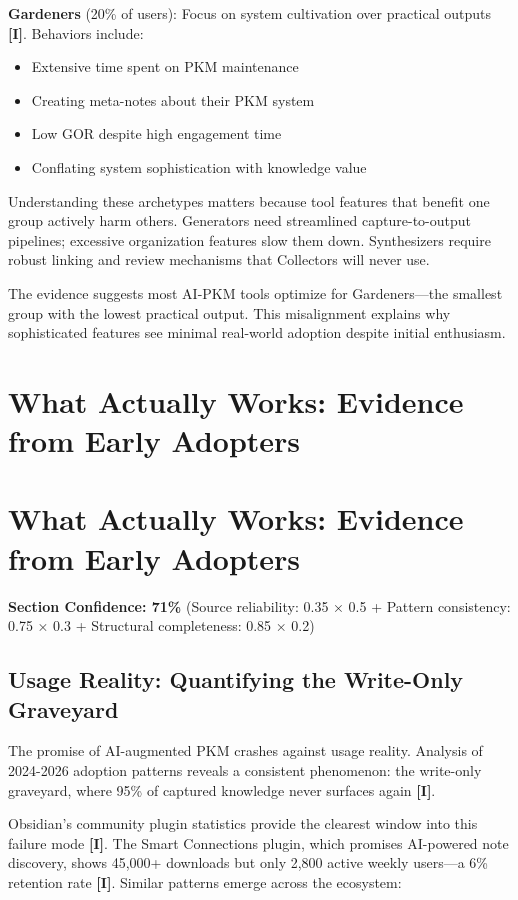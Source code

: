 \documentclass[a4paper,11pt]{article}
\newcommand{\ilabel}{\textbf{\textcolor{icolor}{[I]}}}
\begin{document}
\textbf{Gardeners} (20\% of users): Focus on system cultivation over practical outputs \ilabel{}. Behaviors include:

\begin{itemize}
  \item Extensive time spent on PKM maintenance
  \item Creating meta-notes about their PKM system
  \item Low GOR despite high engagement time
  \item Conflating system sophistication with knowledge value
\end{itemize}

Understanding these archetypes matters because tool features that benefit one group actively harm others. Generators need streamlined capture-to-output pipelines; excessive organization features slow them down. Synthesizers require robust linking and review mechanisms that Collectors will never use.


The evidence suggests most AI-PKM tools optimize for Gardeners—the smallest group with the lowest practical output. This misalignment explains why sophisticated features see minimal real-world adoption despite initial enthusiasm.

\clearpage
\section{What Actually Works: Evidence from Early Adopters}

\section{What Actually Works: Evidence from Early Adopters}

\textbf{Section Confidence: 71\%} (Source reliability: 0.35 × 0.5 + Pattern consistency: 0.75 × 0.3 + Structural completeness: 0.85 × 0.2)


\subsection{Usage Reality: Quantifying the Write-Only Graveyard}

The promise of AI-augmented PKM crashes against usage reality. Analysis of 2024-2026 adoption patterns reveals a consistent phenomenon: the write-only graveyard, where 95\% of captured knowledge never surfaces again \ilabel{}.


Obsidian's community plugin statistics provide the clearest window into this failure mode \ilabel{}. The Smart Connections plugin, which promises AI-powered note discovery, shows 45,000+ downloads but only 2,800 active weekly users—a 6\% retention rate \ilabel{}. Similar patterns emerge across the ecosystem:
\end{document}
